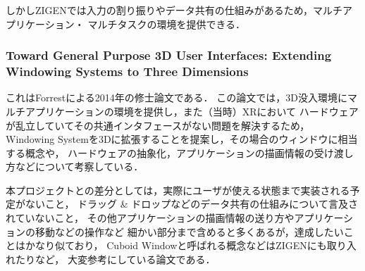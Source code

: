 しかしZIGENでは入力の割り振りやデータ共有の仕組みがあるため，マルチアプリケーション・
マルチタスクの環境を提供できる．

\subsubsection{
  Toward General Purpose 3D User Interfaces:
  Extending Windowing Systems to Three Dimensions \cite{forrest}
}
\label{section:forrest}

これはForrestによる2014年の修士論文である．
この論文では，3D没入環境にマルチアプリケーションの環境を提供し，また（当時）XRにおいて
ハードウェアが乱立していてその共通インタフェースがない問題を解決するため，
Windowing Systemを3Dに拡張することを提案し，その場合のウィンドウに相当する概念や，
ハードウェアの抽象化，アプリケーションの描画情報の受け渡し方などについて考察している．

本プロジェクトとの差分としては，実際にユーザが使える状態まで実装される予定がないこと，
ドラッグ \& ドロップなどのデータ共有の仕組みについて言及されていないこと，
その他アプリケーションの描画情報の送り方やアプリケーションの移動などの操作など
細かい部分まで含めると多くあるが，達成したいことはかなり似ており，
Cuboid Windowと呼ばれる概念などはZIGENにも取り入れたりなど，
大変参考にしている論文である．
